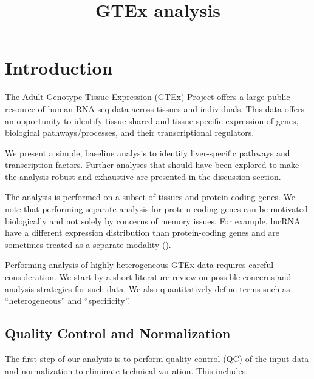 \documentclass{article}
\begin{document}
\title{GTEx analysis}
\maketitle
\tableofcontents

\section{Introduction}

The Adult Genotype Tissue Expression (GTEx) Project offers a large public resource of human RNA-seq data across tissues and individuals. This data offers an opportunity to identify tissue-shared and tissue-specific expression of genes, biological pathways/processes, and their transcriptional regulators.

We present a simple, baseline analysis to identify liver-specific pathways and transcription factors. Further analyses that should have been explored to make the analysis robust and exhaustive are presented in the discussion section.

The analysis is performed on a subset of tissues and protein-coding genes. We note that performing separate analysis for protein-coding genes can be motivated biologically and not solely by concerns of memory issues. For example, lncRNA have a different expression distribution than protein-coding genes and are sometimes treated as a separate modality (\cite{Malagoli2024-gq}).

Performing analysis of highly heterogeneous GTEx data requires careful consideration. We start by a short literature review on possible concerns and analysis strategies for such data. We also quantitatively define terms such as “heterogeneous” and “specificity”.

\subsection{Quality Control and Normalization}

The first step of our analysis is to perform quality control (QC) of the input data and normalization to eliminate technical variation. This includes:
\end{document}
